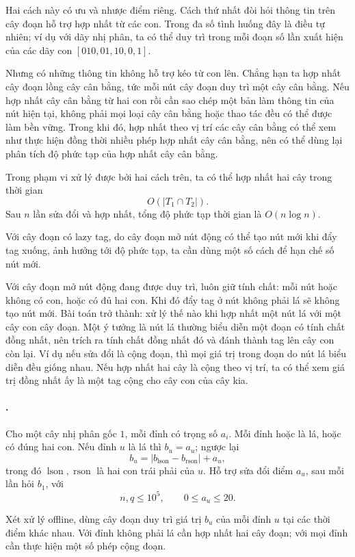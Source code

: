 \documentclass[11pt]{article}
\begin{document}
Hai cách này có ưu và nhược điểm riêng. Cách thứ nhất đòi hỏi thông tin trên cây
đoạn hỗ trợ hợp nhất từ các con. Trong đa số tình huống đây là điều tự nhiên;
ví dụ với dãy nhị phân, ta có thể duy trì trong mỗi đoạn số lần xuất hiện của
các dãy con \([010,01,10,0,1]\).

Nhưng có những thông tin không hỗ trợ kéo từ con lên. Chẳng hạn ta hợp nhất cây
đoạn lồng cây cân bằng, tức mỗi nút cây đoạn duy trì một cây cân bằng. Nếu hợp
nhất cây cân bằng từ hai con rồi cần sao chép một bản làm thông tin của nút
hiện tại, không phải mọi loại cây cân bằng hoặc thao tác đều có thể được làm
bền vững. Trong khi đó, hợp nhất theo vị trí các cây cân bằng có thể xem như
thực hiện đồng thời nhiều phép hợp nhất cây cân bằng, nên có thể dùng lại phân
tích độ phức tạp của hợp nhất cây cân bằng.

Trong phạm vi xử lý được bởi hai cách trên, ta có thể hợp nhất hai cây trong
thời gian
\[
  O(|T_1\cap T_2|).
\]
Sau \(n\) lần sửa đổi và hợp nhất, tổng độ phức tạp thời gian là
\(O(n\log n)\).

Với cây đoạn có lazy tag, do cây đoạn mở nút động có thể tạo nút mới khi đẩy
tag xuống, ảnh hưởng tới độ phức tạp, ta cần dùng một số cách để hạn chế số nút
mới.

Với cây đoạn mở nút động đang được duy trì, luôn giữ tính chất: mỗi nút hoặc
không có con, hoặc có đủ hai con. Khi đó đẩy tag ở nút không phải lá sẽ không
tạo nút mới. Bài toán trở thành: xử lý thế nào khi hợp nhất một nút lá với một
cây con cây đoạn. Một ý tưởng là nút lá thường biểu diễn một đoạn có tính chất
đồng nhất, nên trích ra tính chất đồng nhất đó và đánh thành tag lên cây con
còn lại. Ví dụ nếu sửa đổi là cộng đoạn, thì mọi giá trị trong đoạn do nút lá
biểu diễn đều giống nhau. Nếu hợp nhất hai cây là cộng theo vị trí, ta có thể
xem giá trị đồng nhất ấy là một tag cộng cho cây con của cây kia.

\paragraph{.}
Cho một cây nhị phân gốc \(1\), mỗi đỉnh có trọng số \(a_i\). Mỗi đỉnh hoặc là
lá, hoặc có đúng hai con. Nếu đỉnh \(u\) là lá thì \(b_u=a_u\); ngược lại
\[
  b_u=|b_{\operatorname{lson}}-b_{\operatorname{rson}}|+a_u,
\]
trong đó \(\operatorname{lson},\operatorname{rson}\) là hai con trái phải của
\(u\). Hỗ trợ sửa đổi điểm \(a_u\), sau mỗi lần hỏi \(b_1\), với
\[
  n,q\le 10^5,\qquad 0\le a_u\le 20.
\]

Xét xử lý offline, dùng cây đoạn duy trì giá trị \(b_u\) của mỗi đỉnh \(u\) tại
các thời điểm khác nhau. Với đỉnh không phải lá cần hợp nhất hai cây đoạn; với
mọi đỉnh cần thực hiện một số phép cộng đoạn.
\end{document}

